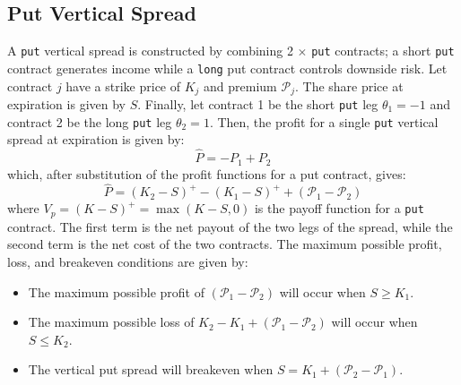 \documentclass[11pt]{article}
\theoremstyle{definition}
\begin{document}
\subsection*{Put Vertical Spread}
A \texttt{put} vertical spread is constructed by combining 2 $\times$ \texttt{put} contracts; a short \texttt{put} contract generates income while a \texttt{long} put contract controls downside risk.  
Let contract $j$ have a strike price of $K_{j}$ and premium $\mathcal{P}_{j}$. 
The share price at expiration is given by $S$. 
Finally, let contract 1 be the short \texttt{put} leg $\theta_{1} = -1$ and contract 2 be the long \texttt{put} leg $\theta_{2} = 1$. 
Then, the profit for a single \texttt{put} vertical spread at expiration is given by:
\begin{equation}
\hat{P} = -P_{1}+P_{2}
\end{equation}
which, after substitution of the profit functions for a put contract, gives:
\begin{equation}
\hat{P} = \left(K_{2} - S\right)^{+} - \left(K_{1} - S\right)^{+} + \left(\mathcal{P}_{1} - \mathcal{P}_{2}\right)
\end{equation}
where $V_{p} = (K-S)^{+}=\max(K-S,0)$ is the payoff function for a \texttt{put} contract. 
The first term is the net payout of the two legs of the spread, while the second term is the net cost of the two contracts. 
The maximum possible profit, loss, and breakeven conditions are given by:
\begin{itemize}
\item{The maximum possible profit of $\left(\mathcal{P}_{1} - \mathcal{P}_{2}\right)$ will occur when $S\geq{K_{1}}$.}
\item{The maximum possible loss of $K_{2} - K_{1} + \left(\mathcal{P}_{1} - \mathcal{P}_{2}\right)$ will occur when $S\leq{K_{2}}$.}
\item{The vertical put spread will breakeven when $S =  K_{1}+\left(\mathcal{P}_{2} - \mathcal{P}_{1}\right)$.}
\end{itemize}
\end{document}
